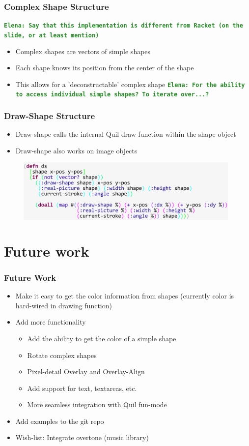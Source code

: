 \documentclass{beamer}
\newcommand{\comment}[1]{{\bf \tt  {#1}}}
\newcommand{\emcomment}[1]{\textcolor{ForestGreen}{\comment{Elena: {#1}}}}
\begin{document}
\begin{frame}
\frametitle{Complex Shape Structure}
\emcomment{Say that this implementation is different from Racket (on the slide, or at least mention)}
	\begin{itemize}
		\item Complex shapes are vectors of simple shapes
		\item Each shape knows its position from the center of the shape
		\item This allows for a 'deconstructable' complex shape \emcomment{For the ability to access individual simple shapes? To iterate over...?}
	\end{itemize}
\end{frame}

\begin{frame}
\frametitle{Draw-Shape Structure}
	\begin{itemize}
		\item Draw-shape calls the internal Quil draw function within the shape object
		\item Draw-shape also works on image objects
	\end{itemize}
	\begin{figure}
		\includegraphics[width=11cm]{PresentationImages/dsCode.png}
	\end{figure}
\end{frame}

\section{Future work}

\begin{frame}
	\frametitle{Future Work}
	\begin{itemize}
		\item Make it easy to get the color information from shapes (currently color is hard-wired in drawing function) 
		\item Add more functionality
		\begin{itemize}
			\item Add the ability to get the color of a simple shape
			\item Rotate complex shapes
			\item Pixel-detail Overlay and Overlay-Align
			\item Add support for text, textareas, etc.  
			\item More seamless integration with Quil fun-mode
		\end{itemize}
		\item Add examples to the git repo 
		\item Wish-list: Integrate overtone (music library)
	\end{itemize}
\end{frame}
\end{document}
